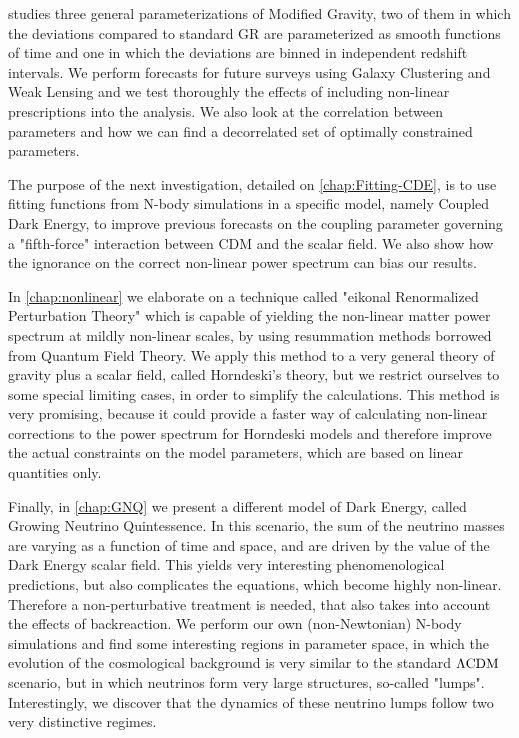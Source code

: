  studies 
three general parameterizations of Modified Gravity, two of them in which the deviations compared to standard GR are parameterized as smooth functions of time and one in which the deviations are binned in independent redshift intervals. We perform forecasts for future surveys using Galaxy Clustering and Weak Lensing and we test
thoroughly the effects of including non-linear prescriptions into the analysis. We also look at the correlation
between parameters and how we can find a decorrelated set of optimally constrained parameters.

The purpose of the next investigation, detailed on \cref{chap:Fitting-CDE}, is to use fitting functions from N-body simulations in a specific model, namely Coupled Dark Energy, to improve 
previous forecasts on the coupling parameter governing a "fifth-force" interaction between CDM and 
the scalar field. We also show how the ignorance on the correct non-linear power spectrum can bias our results.

In \cref{chap:nonlinear} we elaborate on a technique called "eikonal Renormalized Perturbation Theory"
which is capable of yielding the non-linear matter power spectrum at mildly non-linear scales, by using resummation methods borrowed from Quantum Field Theory. 
We apply this method to a very general theory of gravity plus a scalar field, called Horndeski's theory, but we restrict ourselves to some special limiting cases, in order to  simplify the calculations. This  method
is very promising, because it could provide a faster way of calculating non-linear corrections to the power spectrum for Horndeski models and therefore improve the actual constraints on the model parameters, which are based on linear quantities only.

Finally, in \cref{chap:GNQ} we present a different model of Dark Energy, called Growing Neutrino Quintessence.
In this scenario, the sum of the neutrino masses are varying as a function of time and space, 
and are driven by the value of the Dark Energy scalar field. 
This yields very interesting phenomenological predictions, but also complicates the equations, 
which become highly non-linear. Therefore a non-perturbative treatment is needed, that also takes into 
account the effects of backreaction.
We perform our own (non-Newtonian) N-body simulations and find some interesting regions in parameter space, 
in which the evolution of the cosmological background is very similar to the standard $\Lambda\mathrm{CDM}$ scenario, 
but in which neutrinos form very large structures, so-called "lumps".
Interestingly, we discover that the dynamics of these neutrino lumps follow two very distinctive regimes.

